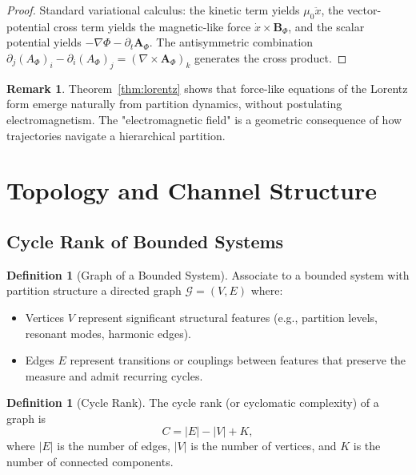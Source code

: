 \documentclass[11pt,twocolumn,a4paper]{article}
\theoremstyle{definition}
\newtheorem{definition}[theorem]{Definition}
\newtheorem{remark}[theorem]{Remark}
\newcommand{\calG}{\mathcal{G}}
\begin{document}
\begin{proof}
Standard variational calculus: the kinetic term yields $\mu_0\ddot{x}$, the vector-potential cross term yields the magnetic-like force $\dot{x} \times \bm{B}_\Phi$, and the scalar potential yields $-\nabla\Phi - \partial_t\bm{A}_\Phi$. The antisymmetric combination $\partial_j(A_\Phi)_i - \partial_i(A_\Phi)_j = (\nabla \times \bm{A}_\Phi)_k$ generates the cross product.
\end{proof}

\begin{remark}
Theorem~\ref{thm:lorentz} shows that force-like equations of the Lorentz form emerge naturally from partition dynamics, without postulating electromagnetism. The "electromagnetic field" is a geometric consequence of how trajectories navigate a hierarchical partition.
\end{remark}

\section{Topology and Channel Structure}
\label{sec:topology}

\subsection{Cycle Rank of Bounded Systems}

\begin{definition}[Graph of a Bounded System]
Associate to a bounded system with partition structure a directed graph $\calG = (V, E)$ where:
\begin{itemize}[nosep]
\item Vertices $V$ represent significant structural features (e.g., partition levels, resonant modes, harmonic edges).
\item Edges $E$ represent transitions or couplings between features that preserve the measure and admit recurring cycles.
\end{itemize}
\end{definition}

\begin{definition}[Cycle Rank]
The cycle rank (or cyclomatic complexity) of a graph is
\[
C = |E| - |V| + K,
\]
where $|E|$ is the number of edges, $|V|$ is the number of vertices, and $K$ is the number of connected components.
\end{definition}
\end{document}
